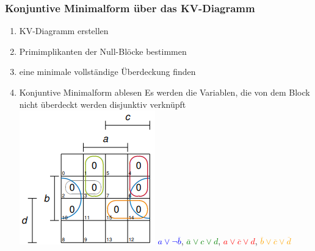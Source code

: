 \documentclass[12pt]{article}
\begin{document}
\subsubsection{Konjuntive Minimalform über das KV-Diagramm}
\begin{enumerate}
    \item KV-Diagramm erstellen
    \item Primimplikanten der Null-Blöcke bestimmen
    \item eine minimale vollständige Überdeckung finden
    \item Konjuntive Minimalform ablesen
    \subitem \vbox{Es werden die Variablen, die von dem Block nicht überdeckt werden disjunktiv verknüpft}
    \subitem \includegraphics{image7.png}
    \subitem \textcolor{blue}{$a \lor \neg \overline{b}$}, \textcolor{green}{$\overline{a} \lor c \lor d$}, \textcolor{red}{$a \lor \overline{c} \lor d$}, \textcolor{orange}{$\overline{b} \lor \overline{c} \lor \overline{d}$}
\end{enumerate}
\end{document}
